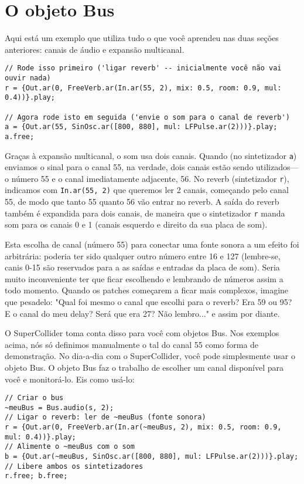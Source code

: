 \section{O objeto Bus}
\label{sec:busobject}

Aqui está um exemplo que utiliza tudo o que você aprendeu nas duas seções anteriores: canais de áudio e expansão multicanal.
 
\begin{lstlisting}[style=SuperCollider-IDE, basicstyle=\scttfamily\footnotesize]
// Rode isso primeiro ('ligar reverb' -- inicialmente você não vai ouvir nada)
r = {Out.ar(0, FreeVerb.ar(In.ar(55, 2), mix: 0.5, room: 0.9, mul: 0.4))}.play;

// Agora rode isto em seguida ('envie o som para o canal de reverb')
a = {Out.ar(55, SinOsc.ar([800, 880], mul: LFPulse.ar(2)))}.play;
a.free;
\end{lstlisting}
 

Graças à expansão multicanal, o som usa dois canais. Quando (no sintetizador \texttt{a}) enviamos o sinal para o canal 55, na verdade, dois canais estão sendo utilizados---o número 55 e o canal imediatamente adjacente, 56. No reverb (sintetizador \texttt{r}), indicamos com \texttt{In.ar(55, 2)} que queremos ler 2 canais, começando pelo canal 55, de modo que tanto 55 quanto 56 vão entrar no reverb. A saída do reverb também é expandida para dois canais, de maneira que o sintetizador \texttt{r} manda som para os canais 0 e 1 (canais esquerdo e direito da sua placa de som).

Esta escolha de canal (número 55) para conectar uma fonte sonora a um efeito foi arbitrária: poderia ter sido qualquer outro número entre 16 e 127 (lembre-se, canis 0-15 são reservados para a as saídas e entradas da placa de som). Seria muito inconveniente ter que ficar escolhendo e lembrando de números assim a todo momento. Quando os patches começarem a ficar mais complexos, imagine que pesadelo: "Qual foi mesmo o canal que escolhi para o reverb? Era 59 ou 95? E o canal do meu delay? Será que era 27? Não lembro..." e assim por diante.

O SuperCollider toma conta disso para você com objetos Bus. Nos exemplos acima, nós só definimos manualmente o tal do canal 55 como forma de demonstração. No dia-a-dia com o SuperCollider, você pode simplesmente usar o objeto Bus. O objeto Bus faz o trabalho de escolher um canal disponível para você e monitorá-lo. Eis como usá-lo:

 
\begin{lstlisting}[style=SuperCollider-IDE, basicstyle=\scttfamily\footnotesize]
// Criar o bus
~meuBus = Bus.audio(s, 2);
// Ligar o reverb: ler de ~meuBus (fonte sonora)
r = {Out.ar(0, FreeVerb.ar(In.ar(~meuBus, 2), mix: 0.5, room: 0.9, mul: 0.4))}.play;
// Alimente o ~meuBus com o som
b = {Out.ar(~meuBus, SinOsc.ar([800, 880], mul: LFPulse.ar(2)))}.play;
// Libere ambos os sintetizadores
r.free; b.free;
\end{lstlisting}
 

